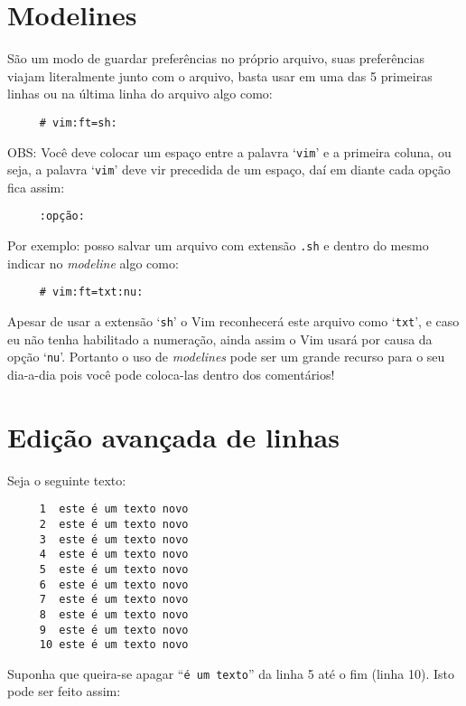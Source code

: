 \section{Modelines}\label{sec:Modelines}

São um modo de guardar preferências no próprio arquivo, suas
preferências viajam literalmente junto com o arquivo, basta usar em
uma das 5 primeiras linhas ou na última linha do arquivo algo
como:

\begin{verbatim}
     # vim:ft=sh:
\end{verbatim}

OBS: Você deve colocar um espaço entre a palavra `{\tt vim}' e a primeira
coluna, ou seja, a palavra `{\tt vim}' deve vir precedida de um espaço, daí
em diante cada opção fica assim:

\begin{verbatim}
     :opção:
\end{verbatim}

Por exemplo: posso salvar um arquivo com extensão \verb|.sh| e dentro do
mesmo indicar no {\em modeline} algo como:

\begin{verbatim}
     # vim:ft=txt:nu:
\end{verbatim}

Apesar de usar a extensão `{\tt sh}' o Vim reconhecerá este arquivo como `{\tt txt}', e
caso eu não tenha habilitado a numeração, ainda assim o Vim usará por causa da
opção `{\tt nu}'.  Portanto o uso de {\em modelines} pode ser um grande recurso para o seu
dia-a-dia pois você pode coloca-las dentro dos comentários!

\section{Edição avançada de linhas}

Seja o seguinte texto:

\begin{verbatim}
     1  este é um texto novo
     2  este é um texto novo
     3  este é um texto novo
     4  este é um texto novo
     5  este é um texto novo
     6  este é um texto novo
     7  este é um texto novo
     8  este é um texto novo
     9  este é um texto novo
     10 este é um texto novo
\end{verbatim}

Suponha que queira-se apagar ``{\tt é um texto}'' da linha 5 até o fim (linha
10). Isto pode ser feito assim:

